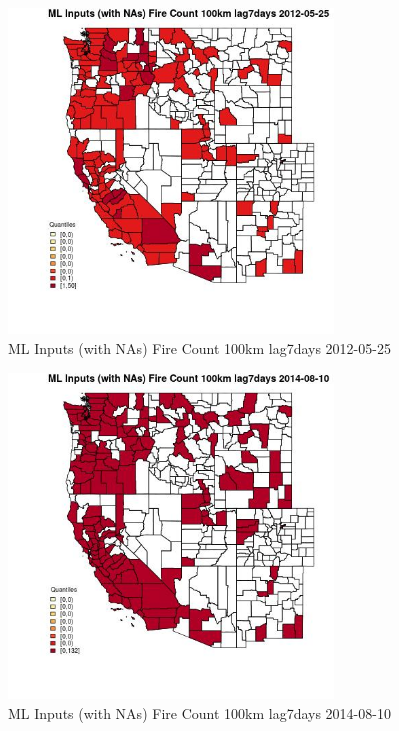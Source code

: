 \begin{figure} 
\centering  
\includegraphics[width=0.77\textwidth]{Code_Outputs/Report_ML_input_PM25_Step4_part_e_de_duplicated_aves_compiled_2019-05-18wNAs_CountyFire_Count_100km_lag7daysMean2012-05-25_2012-05-25.jpg} 
\caption{\label{fig:Report_ML_input_PM25_Step4_part_e_de_duplicated_aves_compiled_2019-05-18wNAsCountyFire_Count_100km_lag7daysMean2012-05-25_2012-05-25}ML Inputs (with NAs) Fire Count 100km lag7days 2012-05-25} 
\end{figure} 
 

\begin{figure} 
\centering  
\includegraphics[width=0.77\textwidth]{Code_Outputs/Report_ML_input_PM25_Step4_part_e_de_duplicated_aves_compiled_2019-05-18wNAs_CountyFire_Count_100km_lag7daysMean2014-08-10_2014-08-10.jpg} 
\caption{\label{fig:Report_ML_input_PM25_Step4_part_e_de_duplicated_aves_compiled_2019-05-18wNAsCountyFire_Count_100km_lag7daysMean2014-08-10_2014-08-10}ML Inputs (with NAs) Fire Count 100km lag7days 2014-08-10} 
\end{figure} 
 

